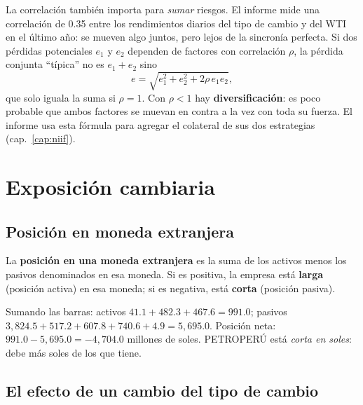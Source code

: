 La correlación también importa para \emph{sumar} riesgos. El informe mide una correlación de 0.35 entre los rendimientos diarios del tipo de cambio y del WTI en el último año: se mueven algo juntos, pero lejos de la sincronía perfecta. Si dos pérdidas potenciales $e_1$ y $e_2$ dependen de factores con correlación $\rho$, la pérdida conjunta \enquote{típica} no es $e_1+e_2$ sino
\[ e=\sqrt{e_1^2+e_2^2+2\rho\,e_1e_2}, \]
que solo iguala la suma si $\rho=1$. Con $\rho<1$ hay \textbf{diversificación}: es poco probable que ambos factores se muevan en contra a la vez con toda su fuerza. El informe usa esta fórmula para agregar el colateral de sus dos estrategias (cap.~\ref{cap:niif}).

\section{Exposición cambiaria}

\subsection{Posición en moneda extranjera}

\begin{definicion}
La \textbf{posición en una moneda extranjera} es la suma de los activos menos los pasivos denominados en esa moneda. Si es positiva, la empresa está \textbf{larga} (posición activa) en esa moneda; si es negativa, está \textbf{corta} (posición pasiva).
\end{definicion}


Sumando las barras: activos $41.1+482.3+467.6=991.0$; pasivos $3{,}824.5+517.2+607.8+740.6+4.9=5{,}695.0$. Posición neta: $991.0-5{,}695.0=-4{,}704.0$ millones de soles. PETROPERÚ está \emph{corta en soles}: debe más soles de los que tiene.

\subsection{El efecto de un cambio del tipo de cambio}

